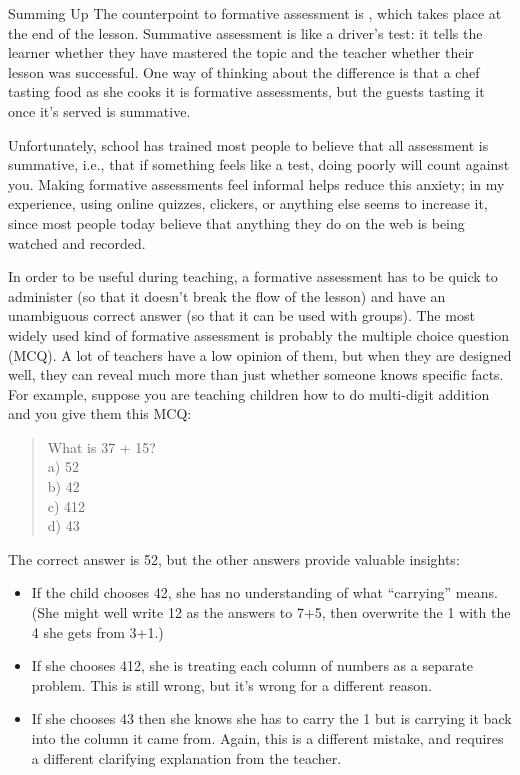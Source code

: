 \begin{aside}{Summing Up}
  The counterpoint to formative assessment is ,
  which takes place at the end of the lesson.
  Summative assessment is like a driver's test:
  it tells the learner whether they have mastered the topic
  and the teacher whether their lesson was successful.
  One way of thinking about the difference is that
  a chef tasting food as she cooks it is formative assessments,
  but the guests tasting it once it's served is summative.

  Unfortunately,
  school has trained most people to believe that all assessment is summative,
  i.e.,
  that if something feels like a test,
  doing poorly will count against you.
  Making formative assessments feel informal helps reduce this anxiety;
  in my experience,
  using online quizzes, clickers, or anything else seems to increase it,
  since most people today believe that anything they do on the web is being watched and recorded.
\end{aside}
  
In order to be useful during teaching,
a formative assessment has to be quick to administer
(so that it doesn't break the flow of the lesson)
and have an unambiguous correct answer
(so that it can be used with groups).
The most widely used kind of formative assessment is probably the multiple choice question (MCQ).
A lot of teachers have a low opinion of them,
but when they are designed well,
they can reveal much more than just whether someone knows specific facts.
For example,
suppose you are teaching children how to do multi-digit addition~\cite{Ojos2015}
and you give them this MCQ:

\begin{quote}
  What is 37 + 15?\\
  a) 52\\
  b) 42\\
  c) 412\\
  d) 43
\end{quote}

\noindent
The correct answer is 52,
but the other answers provide valuable insights:

\begin{itemize}

\item
  If the child chooses 42,
  she has no understanding of what ``carrying'' means.
  (She might well write 12 as the answers to 7+5,
  then overwrite the 1 with the 4 she gets from 3+1.)

\item
  If she chooses 412,
  she is treating each column of numbers as a separate problem.
  This is still wrong,
  but it's wrong for a different reason.

\item
  If she chooses 43 then she knows she has to carry the 1
  but is carrying it back into the column it came from.
  Again,
  this is a different mistake,
  and requires a different clarifying explanation from the teacher.

\end{itemize}

